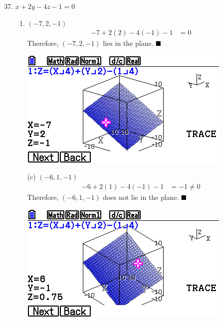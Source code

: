 \begin{enumerate}
    \setcounter{enumi}{36}
    \item $x+2 y-4 z-1=0$
          \begin{enumerate}
              \item $(-7,2,-1)$
                    \sol{}
                    \begin{align*}
                        -7 + 2(2) - 4(-1) - 1 & = 0
                    \end{align*}
                    Therefore, $(-7,2,-1)$ lies in the plane. $\hfill\blacksquare$\\
                    \begin{center}
                        \includegraphics[scale=0.5]{assets/larson11.5q37agraph.png}
                    \end{center}

              \item[(c)] $(-6,1,-1)$ \sol{}
                  \begin{align*}
                      -6 + 2(1) - 4(-1) - 1 & = -1 \neq 0
                  \end{align*}
                  Therefore, $(-6,1,-1)$ does not lie in the plane. $\hfill\blacksquare$ \\
                  \begin{center}
                      \includegraphics[scale=0.5]{assets/larson11.5q37cgraph.png}
                  \end{center}
          \end{enumerate}
\end{enumerate}

